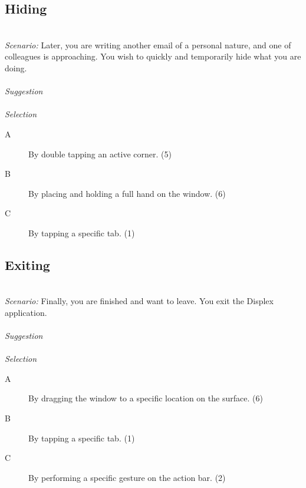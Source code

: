\documentclass[11pt]{amsart}
\begin{document}
\subsection{Hiding}
\hfill\\
\emph{Scenario:}
Later, you are writing another email of a personal nature, and one of colleagues is approaching. You wish to quickly and temporarily hide what you are doing.
\\\\
\emph{Suggestion}
\\\\
\emph{Selection}
\begin{description}
\item[A]{By double tapping an active corner. (5)}
\item[B]{By placing and holding a full hand on the window. (6)}
\item[C]{By tapping a specific tab. (1)}
\end{description}


\subsection{Exiting}
\hfill\\
\emph{Scenario:}
Finally, you are finished and want to leave. You exit the Displex application.
\\\\
\emph{Suggestion}
\\\\
\emph{Selection}
\begin{description}
\item[A]{By dragging the window to a specific location on the surface. (6)}
\item[B]{By tapping a specific tab. (1)}
\item[C]{By performing a specific gesture on the action bar. (2)}
\end{description}
\end{document}
